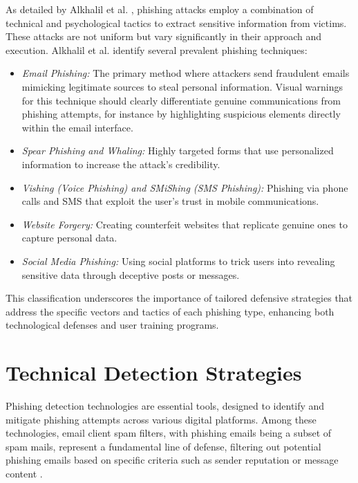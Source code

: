 \documentclass[
  a4paper,  %
  twoside,  %
  bibliography=totoc,
  headsepline,
  cleardoublepage=empty,
  parskip=half,
  draft=false
]{scrbook}
\begin{document}
As detailed by Alkhalil et al. \cite{alkhalil}, phishing attacks employ a combination of technical and psychological tactics to extract sensitive information from victims. These attacks are not uniform but vary significantly in their approach and execution.
Alkhalil et al. identify several prevalent phishing techniques:
\begin{itemize}
    \item \textit{Email Phishing:} The primary method where attackers send fraudulent emails mimicking legitimate sources to steal personal information. Visual warnings for this technique should clearly differentiate genuine communications from phishing attempts, for instance by highlighting suspicious elements directly within the email interface.
    \item \textit{Spear Phishing and Whaling:} Highly targeted forms that use personalized information to increase the attack's credibility.
    \item \textit{Vishing (Voice Phishing) and SMiShing (SMS Phishing):} Phishing via phone calls and SMS that exploit the user's trust in mobile communications.
    \item \textit{Website Forgery:} Creating counterfeit websites that replicate genuine ones to capture personal data.
    \item \textit{Social Media Phishing:} Using social platforms to trick users into revealing sensitive data through deceptive posts or messages.
\end{itemize}

This classification underscores the importance of tailored defensive strategies that address the specific vectors and tactics of each phishing type, enhancing both technological defenses and user training programs.

\section{Technical Detection Strategies}
Phishing detection technologies are essential tools, designed to identify and mitigate phishing attempts across various digital platforms. Among these technologies, email client spam filters, with phishing emails being a subset of spam mails, represent a fundamental line of defense, filtering out potential phishing emails based on specific criteria such as sender reputation \cite{shi} or message content \cite{alexy}.
\end{document}
